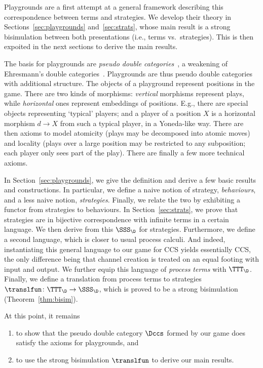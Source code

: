 \documentclass{LMCS}
\theoremstyle{plain}\newtheorem{satz}[thm]{Satz}
\begin{document}
Playgrounds are a first attempt at a general framework describing
this correspondence between terms and strategies. We develop their theory in
Sections~\ref{sec:playgrounds} and~\ref{sec:strats}, whose main result
is a strong bisimulation between both presentations (i.e., terms vs.\
strategies).  This is then expoited in the next sections to derive the
main results.

The basis for playgrounds are \emph{pseudo double
  categories}~\cite{GrandisPare,GrandisPareAdjoints,LeinsterHC,GarnerPhD},
a weakening of Ehresmann's double
categories~\citep{Ehresmann:double,Ehresmann:double2}.  Playgrounds
are thus pseudo double categories with additional structure.  The
objects of a playground represent positions in the game.  There are
two kinds of morphisms: \emph{vertical} morphisms represent plays,
while \emph{horizontal} ones represent embeddings of positions. E.g.,
there are special objects representing `typical' players; and a player
of a position $X$ is a horizontal morphism $d \to X$ from such a
typical player, in a Yoneda-like way. There are then axioms to model
atomicity (plays may be decomposed into atomic moves) and locality
(plays over a large position may be restricted to any subposition;
each player only sees part of the play). There are finally a few more
technical axioms.

In Section~\ref{sec:playgrounds}, we give the definition and derive a
few basic results and constructions. In particular, we define a naive
notion of strategy, \emph{behaviours}, and a less naive notion,
\emph{strategies}.  Finally, we relate the two by exhibiting a functor
from strategies to behaviours.  In Section~\ref{sec:strats}, we prove
that strategies are in bijective correspondence with infinite terms in
a certain language. We then derive from this \anlts{} $\SSS_\D$ for
strategies.  Furthermore, we define a second language, which is closer
to usual process calculi. And indeed, instantiating this general
language to our game for CCS yields essentially CCS, the only
difference being that channel creation is treated on an equal footing
with input and output. We further equip this language of \emph{process
  terms} with \anlts{} $\TTT_\D$.  Finally, we define a translation
from process terms to strategies $\translfun \colon \TTT_\D \to
\SSS_\D$, which is proved to be a strong bisimulation
(Theorem~\ref{thm:bisim}).

At this point, it remains 
\begin{enumerate}\enlargethispage{\baselineskip}
\item to show that the pseudo double category $\Dccs$ formed by our
  game does satisfy the axioms for playgrounds, and
\item to use the strong bisimulation $\translfun$ to derive our main
  results.
\end{enumerate}
\end{document}
